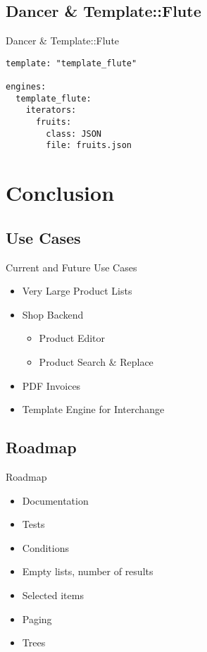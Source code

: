 \subsection{Dancer \& Template::Flute}
\begin{frame}[fragile]{Dancer \& Template::Flute}
\begin{lstlisting}
template: "template_flute"

engines:
  template_flute:
    iterators:
      fruits:
        class: JSON
        file: fruits.json
\end{lstlisting}
\end{frame}

\section{Conclusion}
\subsection{Use Cases}
\begin{frame}{Current and Future Use Cases}
  \begin{itemize}
  \item Very Large Product Lists
  \item Shop Backend
    \begin{itemize}
    \item Product Editor
    \item Product Search \& Replace
    \end{itemize}
  \item PDF Invoices
  \item Template Engine for Interchange
 \end{itemize}
\end{frame}

\subsection{Roadmap}
\begin{frame}{Roadmap}
 \begin{itemize}
   \item Documentation
   \item Tests
   \item Conditions
   \item Empty lists, number of results
   \item Selected items
   \item Paging
   \item Trees 
 \end{itemize}
\end{frame}

